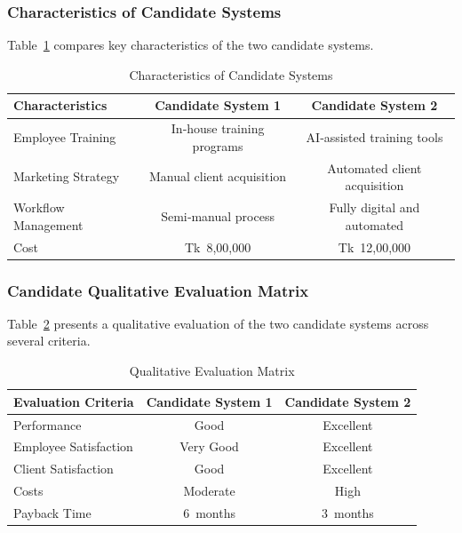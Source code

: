 \documentclass[12pt,a4paper]{article}
\begin{document}
\newpage
\subsubsection{Characteristics of Candidate Systems}
Table~\ref{tab:characteristics} compares key characteristics of the two candidate systems.

\begin{table}[H]
    \centering
    \renewcommand{\arraystretch}{1.3}
    \begin{tabular}{|p{4.5cm}|c|c|}
        \hline
        \textbf{Characteristics} & \textbf{Candidate System 1} & \textbf{Candidate System 2} \\
        \hline
        Employee Training & In‑house training programs & AI‑assisted training tools \\
        \hline
        Marketing Strategy & Manual client acquisition & Automated client acquisition \\
        \hline
        Workflow Management & Semi‑manual process & Fully digital and automated \\
        \hline
        Cost & Tk 8{,}00{,}000 & Tk 12{,}00{,}000 \\
        \hline
    \end{tabular}
    \caption{Characteristics of Candidate Systems}
    \label{tab:characteristics}
\end{table}

\subsubsection{Candidate Qualitative Evaluation Matrix}
Table~\ref{tab:qualitative_matrix} presents a qualitative evaluation of the two candidate systems across several criteria.

\begin{table}[H]
    \centering
    \renewcommand{\arraystretch}{1.3}
    \begin{tabular}{|p{4cm}|c|c|}
        \hline
        \textbf{Evaluation Criteria} & \textbf{Candidate System 1} & \textbf{Candidate System 2} \\
        \hline
        Performance & Good & Excellent \\
        \hline
        Employee Satisfaction & Very Good & Excellent \\
        \hline
        Client Satisfaction & Good & Excellent \\
        \hline
        Costs & Moderate & High \\
        \hline
        Payback Time & 6 months & 3 months \\
        \hline
    \end{tabular}
    \caption{Qualitative Evaluation Matrix}
    \label{tab:qualitative_matrix}
\end{table}
\end{document}
